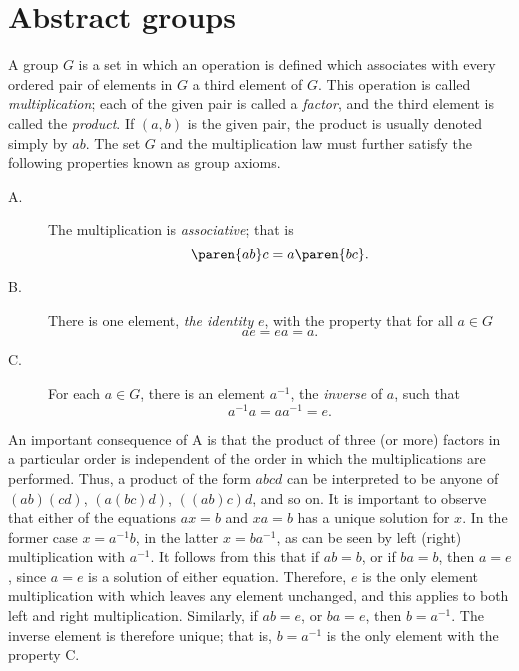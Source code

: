 \section{Abstract groups}

A group $G$ is a set in which an operation is defined which associates with every ordered pair of elements in $G$ a third element of $G$. This operation is called \emph{multiplication}; each of the given pair is called a \emph{factor}, and the third element is called the \emph{product}. If $(a, b)$ is the given pair, the product is usually denoted simply by $ab$. The set $G$ and the multiplication law must further satisfy the following properties known as group axioms.
\begin{description}
%
\item[A.] The multiplication is \emph{associative}; that is
\begin{equation}
  \paren{ab}c = a \paren{bc} . 
  \label{eq:2-1}
\end{equation}
%
\item[B.] There is one element, \emph{the identity} $e$, with the property that for all $a \in G$
\begin{equation}
  a e = ea = a.
  \label{eq:2-2}
\end{equation}
%
\item[C.] For each $a \in G$, there is an element $a^{-1}$, the \emph{inverse} of $a$, such that
\begin{equation}
  a^{-1} a = a a^{-1} = e.
\end{equation}
%
\end{description}

An important consequence of A is that the product of three (or more) factors in a particular order is independent of the order in which the multiplications are performed. Thus, a product of the form $abcd$ can be interpreted to be anyone of $(ab)(cd)$, $(a(bc)d)$, $((ab)c)d$, and so on. It is important to observe that either of the equations $ax = b$ and $xa = b$ has a unique solution for $x$. In the former case $x =a^{-1}b$, in the latter $x =ba^{-1}$, as can be seen by left (right) multiplication with $a^{-1}$. It follows from this that if $ab = b$, or if $ba = b$, then $a = e$, since $a = e$ is a solution of either equation. Therefore, $e$ is the only element multiplication with which leaves any element unchanged, and this applies to both left and right multiplication. Similarly, if $ab = e$, or $ba = e$, then $b =a^{-1}$.	The inverse element is therefore unique; that is, $b =a^{-1}$ is the only element with the property C. 

